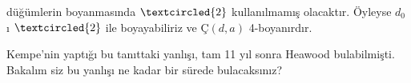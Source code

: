\documentclass[11pt]{amsbook}
\begin{document}

düğümlerin boyanmasında $\textcircled{2}$ kullanılmamış olacaktır. Öyleyse $d_{0}$ ı $\textcircled{2}$ ile boyayabiliriz ve $Ç(d,a)$ 4-boyanırdır.

Kempe'nin yaptığı bu tanıttaki yanlışı, tam 11 yıl sonra Heawood bulabilmişti. Bakalım siz bu yanlışı ne kadar bir sürede bulacaksınız?
\end{document}

